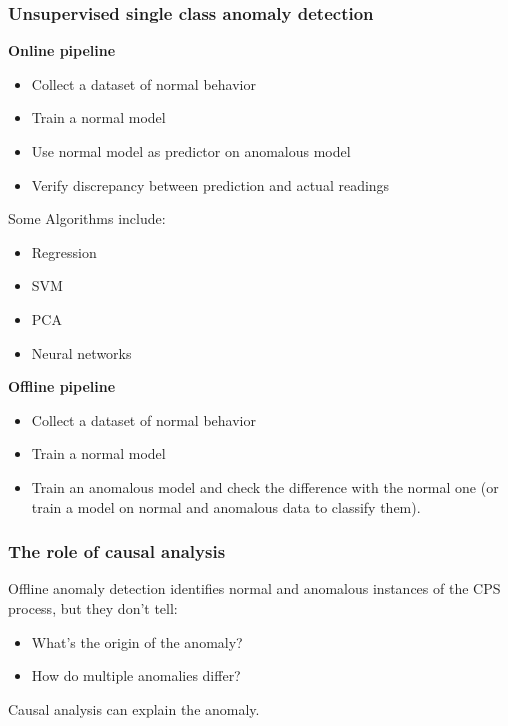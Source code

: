 \subsubsection*{Unsupervised single class anomaly detection}
\textbf{Online pipeline}
    \begin{itemize}
        \item Collect a dataset of normal behavior
        \item Train a normal model
        \item Use normal model as predictor on anomalous model
        \item Verify discrepancy between prediction and actual readings
    \end{itemize}
Some Algorithms include:
\begin{itemize}
    \item Regression
    \item SVM
    \item PCA
    \item Neural networks
\end{itemize}

\textbf{Offline pipeline}
\begin{itemize}
    \item Collect a dataset of normal behavior
    \item Train a normal model
    \item Train an anomalous model and check the difference with the normal one (or train a model on normal and anomalous data to classify them).
\end{itemize}
\subsubsection*{The role of causal analysis}
Offline anomaly detection identifies normal and anomalous instances of the CPS process, but they don't tell:
\begin{itemize}
    \item What's the origin of the anomaly?
    \item How do multiple anomalies differ?
\end{itemize}
Causal analysis can explain the anomaly.
